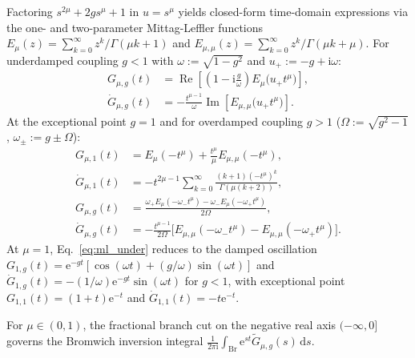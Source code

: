 \documentclass[twocolumn,10pt,amsmath,amssymb,floatfix]{revtex4-2}
\theoremstyle{plain}
\theoremstyle{definition}
\newcommand{\dd}{\mathrm{d}}
\newcommand{\ii}{\mathrm{i}}
\newcommand{\ee}{\mathrm{e}}
\begin{document}
Factoring $s^{2\mu} + 2g s^\mu + 1$ in $u = s^\mu$ yields closed-form time-domain expressions via the one- and two-parameter Mittag-Leffler functions $E_\mu(z) = \sum_{k=0}^\infty z^k / \Gamma(\mu k + 1)$ and $E_{\mu,\mu}(z) = \sum_{k=0}^\infty z^k / \Gamma(\mu k + \mu)$. For underdamped coupling $g < 1$ with $\omega := \sqrt{1-g^2}$ and $u_+ := -g + \ii\omega$:
\begin{align}
\label{eq:ml_under}
G_{\mu,g}(t) &= \operatorname{Re}\!\left[\left(1 - \ii\frac{g}{\omega}\right)E_\mu\big(u_+ t^\mu\big)\right], \nonumber\\
\dot{G}_{\mu,g}(t) &= -\frac{t^{\mu-1}}{\omega}\operatorname{Im}\!\left[E_{\mu,\mu}\big(u_+ t^\mu\big)\right].
\end{align}
At the exceptional point $g = 1$ and for overdamped coupling $g > 1$ ($\Omega := \sqrt{g^2-1}$, $\omega_\pm := g \pm \Omega$):
\begin{align}
G_{\mu,1}(t) &= E_\mu(-t^\mu) + \frac{t^\mu}{\mu} E_{\mu,\mu}(-t^\mu), \label{eq:ml_crit}\\
\dot{G}_{\mu,1}(t) &= -t^{2\mu-1}\sum_{k=0}^\infty \frac{(k+1)(-t^\mu)^k}{\Gamma(\mu(k+2))}, \label{eq:ml_crit_d}\\
G_{\mu,g}(t) &= \frac{\omega_+ E_\mu(-\omega_- t^\mu) - \omega_- E_\mu(-\omega_+ t^\mu)}{2\Omega}, \label{eq:ml_over}\\
\dot{G}_{\mu,g}(t) &= -\frac{t^{\mu-1}}{2\Omega}\big[E_{\mu,\mu}(-\omega_- t^\mu) - E_{\mu,\mu}(-\omega_+ t^\mu)\big]. \label{eq:ml_over_d}
\end{align}
At $\mu = 1$, Eq.~\eqref{eq:ml_under} reduces to the damped oscillation $G_{1,g}(t) = \ee^{-gt}[\cos(\omega t) + (g/\omega)\sin(\omega t)]$ and $\dot{G}_{1,g}(t) = -(1/\omega)\ee^{-gt}\sin(\omega t)$ for $g < 1$, with exceptional point $G_{1,1}(t) = (1+t)\ee^{-t}$ and $\dot{G}_{1,1}(t) = -t\ee^{-t}$.

For $\mu \in (0,1)$, the fractional branch cut on the negative real axis $(-\infty, 0]$ governs the Bromwich inversion integral $\frac{1}{2\pi\ii}\int_{\mathrm{Br}} \ee^{st}\tilde{G}_{\mu,g}(s)\,\dd s$.
\end{document}
